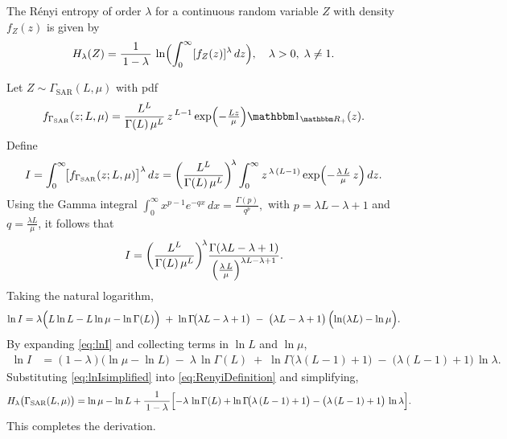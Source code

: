 \documentclass[
  letterpaper,
  11pt,
  english,
  doublespacing,
  headsepline,
  consistentlayout,
  oneside,
  openany]{MastersDoctoralThesis}
\begin{document}
The Rényi entropy of order \(\lambda\) for a continuous random variable
\(Z\) with density \(f_Z(z)\) is given by \begin{align}
H_\lambda(Z) 
&= \frac{1}{\,1 - \lambda\,} \,\ln \Bigl( \int_{0}^{\infty} [f_Z(z)]^\lambda \, dz \Bigr),
\quad \lambda > 0, \;\lambda \neq 1.
\label{eq:RenyiDefinition}
\end{align}

Let \(Z \sim \Gamma_{\text{SAR}}(L, \mu)\) with pdf \begin{align*}
f_{\Gamma_{\text{SAR}}}(z; L, \mu)
&= \frac{L^L}{\Gamma(L)\,\mu^L}\,z^{\,L - 1} 
  \exp\Bigl(-\tfrac{L z}{\mu}\Bigr)\mathbbm 1_{\mathbbm R_+}(z).
\end{align*} Define \begin{align*}
I 
&= \int_{0}^{\infty}\!\bigl[f_{\Gamma_{\text{SAR}}}(z; L,\mu)\bigr]^\lambda \,dz 
 = \biggl(\frac{L^L}{\Gamma(L)\,\mu^L}\biggr)^{\!\lambda}
   \int_{0}^{\infty} 
   z^{\,\lambda\,(L-1)} \exp\Bigl(-\tfrac{\lambda\,L}{\mu}\,z\Bigr)\,dz.
\end{align*} Using the Gamma integral \(\displaystyle
  \int_{0}^{\infty} x^{p-1} e^{-qx}\,dx
   = \frac{\Gamma(p)}{q^p},\) with \(p = \lambda L - \lambda + 1\) and
\(q = \tfrac{\lambda L}{\mu}\), it follows that \begin{align*}
I 
&= \biggl(\frac{L^L}{\Gamma(L)\,\mu^L}\biggr)^{\!\lambda}
   \frac{\Gamma(\lambda L - \lambda + 1)}
        {\Bigl(\tfrac{\lambda\,L}{\mu}\Bigr)^{\lambda L - \lambda + 1}}.
\end{align*} Taking the natural logarithm, \begin{align}
\ln I 
&= \lambda\Bigl(L \ln L - L \ln \mu - \ln \Gamma(L)\Bigr)
   \;+\; \ln\Gamma\!\bigl(\lambda L - \lambda + 1\bigr)
   \;-\; \bigl(\lambda L - \lambda + 1\bigr)\,\Bigl(\ln(\lambda L) - \ln\mu\Bigr).
\label{eq:lnI}
\end{align} By expanding \eqref{eq:lnI} and collecting terms in
\(\ln L\) and \(\ln \mu\), \begin{align}
\ln I 
&= (1 - \lambda)\bigl(\ln \mu - \ln L\bigr)
   \;-\;\lambda\,\ln \Gamma(L)
   \;+\;\ln\Gamma\!\bigl(\lambda(L-1)+1\bigr)
   \;-\;\bigl(\lambda(L-1)+1\bigr)\,\ln \lambda.
\label{eq:lnIsimplified}
\end{align} Substituting \eqref{eq:lnIsimplified} into
\eqref{eq:RenyiDefinition} and simplifying, \begin{multline}
H_\lambda\bigl(\Gamma_{\text{SAR}}(L,\mu)\bigr) 
= \ln \mu - \ln L 
  + \frac{1}{\,1-\lambda\,}
  \Bigl[
    -\lambda\,\ln\Gamma(L)
    + \ln\Gamma\!\bigl(\lambda\,(L-1)+1\bigr)
    - \bigl(\lambda\,(L-1)+1\bigr)\,\ln\lambda
  \Bigr].
\label{eq:RenyiFinal}
\end{multline} This completes the derivation.
\end{document}
